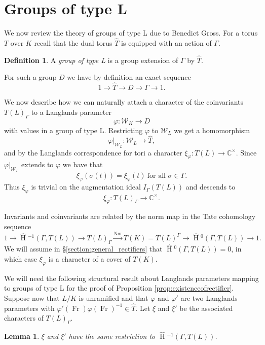 \documentclass[11pt]{amsart}
\theoremstyle{plain}
\newtheorem{lemma}[theorem]{Lemma}
\newcommand{\HT}[1]{\hat{\HH}{}^{#1}}
\theoremstyle{definition}
\newtheorem{definition}[theorem]{Definition}
\DeclareMathOperator{\HH}{H}
\DeclareMathOperator{\Nm}{Nm}
\DeclareMathOperator{\Fr}{Fr}
\newcommand{\CCx}{\mathbb{C}^\times}
\newcommand{\Weil}{\mathcal{W}}
\begin{document}
\section{Groups of type L} \label{section:groups_of_type_L}

We now review the theory of groups of type L due to Benedict
Gross.  For a torus $T$ over $K$ recall that the dual torus $\hat{T}$ is equipped with
an action of $\Gamma$.

\begin{definition}
A \emph{group of type L} is a group extension of $\Gamma$ by $\hat{T}$.
\end{definition}

For such a group $D$ we have by definition an exact sequence
$$1 \rightarrow \hat{T} \rightarrow D \rightarrow \Gamma \rightarrow 1.$$

We now describe how we can naturally attach a character of the coinvariants
$T(L)_{\Gamma}$ to a Langlands parameter
$$\varphi : \Weil_K \rightarrow D$$
with values in a group of type L.
Restricting $\varphi$ to $\Weil_L$ we get a homomorphism
$$\varphi|_{\Weil_L} : \Weil_L \rightarrow \hat{T},$$
and by the Langlands correspondence for tori a character
$\xi_{\varphi} : T(L) \rightarrow \CCx$.  Since $\varphi|_{\Weil_L}$ extends
to $\varphi$ we have that
$$\xi_{\varphi}(\sigma(t)) = \xi_{\varphi}(t)\ \mbox{for all $\sigma \in \Gamma$.}$$
Thus $\xi_{\varphi}$ is trivial on the augmentation ideal $I_{\Gamma}(T(L))$
and descends to $$\xi_{\varphi} : T(L)_\Gamma \rightarrow \CCx.$$

Invariants
and coinvariants are related by the norm map
in the Tate cohomology sequence
$$1 \rightarrow \HT{-1}(\Gamma,T(L)) \rightarrow T(L)_{\Gamma} \xrightarrow{\Nm} T(K)
  = T(L)^{\Gamma} \rightarrow \HT{0}(\Gamma,T(L)) \rightarrow 1.$$
We will assume in \S \ref{section:general_rectifiers} that $\HT{0}(\Gamma,T(L)) = 0$, in which case
$\xi_\varphi$ is a character of a cover of $T(K)$.

We will need the following structural result about Langlands
parameters mapping to groups of type L for the proof of
Proposition \ref{prop:existenceofrectifier}.  Suppose now that $L/K$ is unramified and that
$\varphi$ and $\varphi'$ are two Langlands parameters
with $\varphi'(\Fr) \varphi(\Fr)^{-1} \in \hat{T}$.
Let $\xi$ and $\xi'$ be the associated characters of $T(L)_{\Gamma}$.

\begin{lemma} \label{lem:toral_modification}
$\xi$ and $\xi'$ have the same restriction to $\HT{-1}(\Gamma, T(L))$.
\end{lemma}
\end{document}
